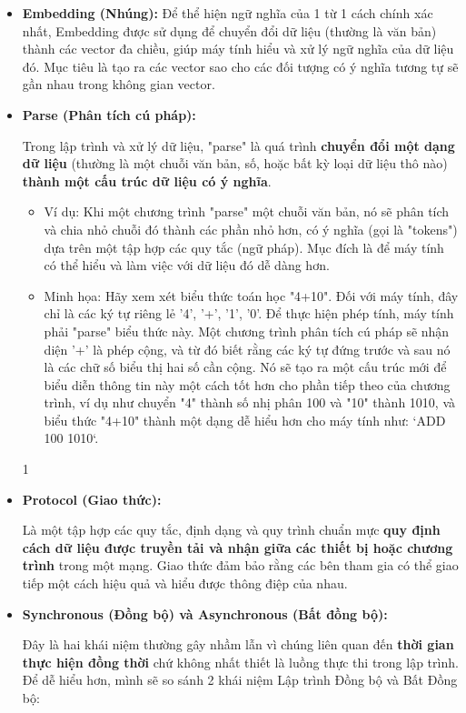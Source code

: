 \documentclass[11pt]{article}
\begin{document}
\begin{itemize}
	\item \textbf{Embedding (Nhúng):} \label{app:embedding} Để thể hiện ngữ nghĩa của 1 từ 1 cách chính xác nhất, Embedding được sử dụng để chuyển đổi dữ liệu (thường là văn bản) thành các vector đa chiều, giúp máy tính hiểu và xử lý ngữ nghĩa của dữ liệu đó. Mục tiêu là tạo ra các vector sao cho các đối tượng có ý nghĩa tương tự sẽ gần nhau trong không gian vector.

    \item \textbf{Parse (Phân tích cú pháp):} \label{app:parse}
    \begin{boxC}
        Trong lập trình và xử lý dữ liệu, "parse" là quá trình \textbf{chuyển đổi một dạng dữ liệu} (thường là một chuỗi văn bản, số, hoặc bất kỳ loại dữ liệu thô nào) \textbf{thành một cấu trúc dữ liệu có ý nghĩa}.
        \begin{itemize}
            \item Ví dụ: Khi một chương trình "parse" một chuỗi văn bản, nó sẽ phân tích và chia nhỏ chuỗi đó thành các phần nhỏ hơn, có ý nghĩa (gọi là "tokens") dựa trên một tập hợp các quy tắc (ngữ pháp). Mục đích là để máy tính có thể hiểu và làm việc với dữ liệu đó dễ dàng hơn.
            \item Minh họa: Hãy xem xét biểu thức toán học "4+10". Đối với máy tính, đây chỉ là các ký tự riêng lẻ '4', '+', '1', '0'. Để thực hiện phép tính, máy tính phải "parse" biểu thức này. Một chương trình phân tích cú pháp sẽ nhận diện '+' là phép cộng, và từ đó biết rằng các ký tự đứng trước và sau nó là các chữ số biểu thị hai số cần cộng. Nó sẽ tạo ra một cấu trúc mới để biểu diễn thông tin này một cách tốt hơn cho phần tiếp theo của chương trình, ví dụ như chuyển "4" thành số nhị phân 100 và "10" thành 1010, và biểu thức "4+10" thành một dạng dễ hiểu hơn cho máy tính như: `ADD 100 1010`.
        \end{itemize}
    \end{boxC}
1
    \item \textbf{Protocol (Giao thức):} \label{app:protocol}
    \begin{boxC}
        Là một tập hợp các quy tắc, định dạng và quy trình chuẩn mực \textbf{quy định cách dữ liệu được truyền tải và nhận giữa các thiết bị hoặc chương trình} trong một mạng. Giao thức đảm bảo rằng các bên tham gia có thể giao tiếp một cách hiệu quả và hiểu được thông điệp của nhau.
    \end{boxC}

    \item \textbf{Synchronous (Đồng bộ) và Asynchronous (Bất đồng bộ):} \label{app:synchronous_asynchronous}
    \begin{boxC}
        Đây là hai khái niệm thường gây nhầm lẫn vì chúng liên quan đến \textbf{thời gian thực hiện đồng thời} chứ không nhất thiết là luồng thực thi trong lập trình. Để dễ hiểu hơn, mình sẽ so sánh 2 khái niệm Lập trình Đồng bộ và Bất Đồng bộ:


\end{boxC}
\end{itemize}
\end{document}
